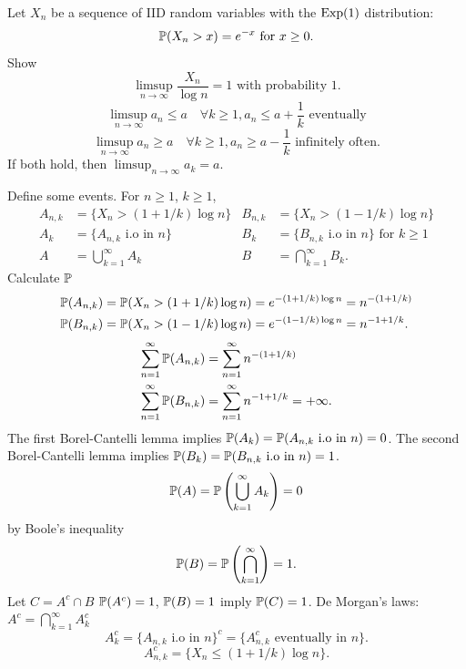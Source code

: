 \documentclass[10pt, a4paper]{article}
\begin{document}
\begin{problem}
    Let $X_n$ be a sequence of IID random variables with the $\Exp(1)$ distribution:
    \[
    \P(X_n > x) = e ^ {-x}\text{ for } x \geq 0.
    \]
    Show
    \[
    \limsup_{n \to \infty}\frac{X_n}{\log{n}} = 1\text{ with probability $1$}.
    \]
    \[
    \limsup_{n \to \infty}a_n \leq a\quad \forall k \geq 1, a_n \leq a + \frac{1}{k}\text{ eventually}
    \]
    \[
    \limsup_{n \to \infty}a_n \geq a\quad \forall k \geq 1, a_n \geq a - \frac{1}{k}\text{ infinitely often}.
    \]
    If both hold,
    then $\limsup_{n \to \infty}a_k = a$.

    \begin{solution}
        Define some events.
        For $n \geq 1$,
        $k \geq 1$,
        \begin{align*}
            A_{n, k} &= \{X_n > (1 + 1 / k)\log{n}\} & B_{n, k} &= \{X_n > (1 - 1 / k)\log{n}\} \\
            A_k &= \{A_{n, k}\text{ i.o in $n$}\} & B_k &= \{B_{n, k}\text{ i.o in $n$}\}\text{ for $k \geq 1$} \\
            A &= \bigcup_{k = 1}^{\infty}A_k & B 
            &= \bigcap_{k = 1}^{\infty}B_k.
        \end{align*}
        Calculate $\P$
        \begin{align*}
            \P(A_{n, k}) &= \P(X_n > (1 + 1 / k)\log{n}) = e ^ {-(1 + 1 / k)\log{n}} = n ^ {-(1 + 1 / k)} \\
            \P(B_{n, k}) &=  \P(X_n > (1 - 1 / k)\log{n}) = e ^ {-(1 - 1 / k)\log{n}} = n ^ {-1 + 1 / k}.
        \end{align*}
        \begin{align*}
            \sum_{n = 1}^{\infty}\P(A_{n, k}) &= \sum_{n = 1}^{\infty}n ^ {-(1 + 1 / k)} \\
            \sum_{n = 1}^{\infty}\P(B_{n, k}) &= \sum_{n = 1}^{\infty}n ^ {-1 + 1 / k} = +\infty.
        \end{align*}
        The first Borel-Cantelli lemma implies $\P(A_{k}) = \P(A_{n, k}\text{ i.o in $n$}) = 0$.
        The second Borel-Cantelli lemma implies $\P(B_k) = \P(B_{n, k}\text{ i.o in $n$}) = 1$.
        \[
        \P(A) = \P\left(\bigcup_{k = 1}^{\infty}A_k\right) = 0
        \]
        by Boole's inequality
        \[
        \P(B) = \P\left(\bigcap_{k = 1}^{\infty}\right) = 1.
        \]
        Let $C = A ^ c \cap B$
        $\P(A ^ c) = 1$,
        $\P(B) = 1$ imply $\P(C) = 1$.
        De Morgan's laws:
        $A ^ c = \bigcap_{k = 1}^{\infty}A_k ^ c$
        \[
        A_k ^ c = \{A_{n, k}\text{ i.o in $n$}\} ^ c = \{A_{n, k} ^ c \text{ eventually in $n$}\}.
        \]
        \[
        A_{n, k}^{c} = \{X_n \leq (1 + 1 / k)\log{n}\}.
        \]


\end{solution}
\end{problem}
\end{document}
